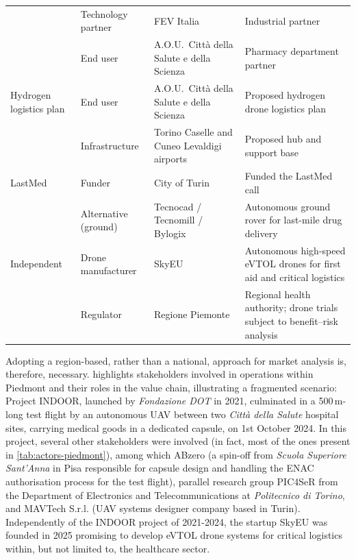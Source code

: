 {\begin{longtable}{G{0.14} L{0.17} L{0.27} L{0.42}}
& Technology partner & FEV Italia & Industrial partner \\
& End user & A.O.U.\ Citt\`a della Salute e della Scienza & Pharmacy department partner \\
\grouprule
Hydrogen logistics plan
& End user & A.O.U.\ Citt\`a della Salute e della Scienza & Proposed hydrogen drone logistics plan \cite{hydronews_torino} \\
& Infrastructure & Torino Caselle and Cuneo Levaldigi airports & Proposed hub and support base \cite{hydronews_torino} \\
\grouprule
LastMed
& Funder & City of Turin & Funded the LastMed call \cite{newpharma_lastmed} \\
& Alternative (ground) & Tecnocad / Tecnomill / Bylogix & Autonomous ground rover for last-mile drug delivery \cite{ansa_lastmed} \\
\grouprule
Independent
& Drone manufacturer & SkyEU & Autonomous high-speed eVTOL drones for first aid and critical logistics \cite{skyeu_web} \\
& Regulator & Regione Piemonte & Regional health authority; drone trials subject to benefit--risk analysis \cite{cr_piemonte} \\
\end{longtable}
}

Adopting a region-based, rather than a national, approach for market analysis is, therefore, necessary.  highlights stakeholders involved in operations within Piedmont and their roles in the value chain, illustrating a fragmented scenario: Project INDOOR, launched by \textit{Fondazione DOT} in 2021, culminated in a 500\,m-long test flight by an autonomous UAV between two \textit{Città della Salute} hospital sites, carrying medical goods in a dedicated capsule, on 1st October 2024. In this project, several other stakeholders were involved (in fact, most of the ones present in \cref{tab:actors-piedmont}), among which ABzero (a spin-off from \textit{Scuola Superiore Sant'Anna} in Pisa responsible for capsule design and handling the ENAC authorisation process for the test flight), parallel research group PIC4SeR from the Department of Electronics and Telecommunications at \textit{Politecnico di Torino}, and MAVTech S.r.l. (UAV systems designer company based in Turin). Independently of the INDOOR project of 2021-2024, the startup SkyEU was founded in 2025 promising to develop eVTOL drone systems for critical logistics within, but not limited to, the healthcare sector.

